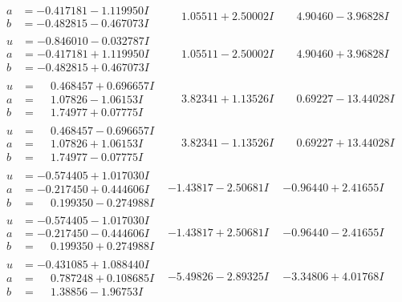 \documentclass[1p]{elsarticle_modified}
\theoremstyle{definition}
\begin{document}
$$\begin{array}{c|c|c}
\begin{aligned}
a &= -0.417181 - 1.119950 I \\
b &= -0.482815 - 0.467073 I\end{aligned}
 & \phantom{-}1.05511 + 2.50002 I & \phantom{-}4.90460 - 3.96828 I \\ \hline\begin{aligned}
u &= -0.846010 - 0.032787 I \\
a &= -0.417181 + 1.119950 I \\
b &= -0.482815 + 0.467073 I\end{aligned}
 & \phantom{-}1.05511 - 2.50002 I & \phantom{-}4.90460 + 3.96828 I \\ \hline\begin{aligned}
u &= \phantom{-}0.468457 + 0.696657 I \\
a &= \phantom{-}1.07826 - 1.06153 I \\
b &= \phantom{-}1.74977 + 0.07775 I\end{aligned}
 & \phantom{-}3.82341 + 1.13526 I & \phantom{-}0.69227 - 13.44028 I \\ \hline\begin{aligned}
u &= \phantom{-}0.468457 - 0.696657 I \\
a &= \phantom{-}1.07826 + 1.06153 I \\
b &= \phantom{-}1.74977 - 0.07775 I\end{aligned}
 & \phantom{-}3.82341 - 1.13526 I & \phantom{-}0.69227 + 13.44028 I \\ \hline\begin{aligned}
u &= -0.574405 + 1.017030 I \\
a &= -0.217450 + 0.444606 I \\
b &= \phantom{-}0.199350 - 0.274988 I\end{aligned}
 & -1.43817 - 2.50681 I & -0.96440 + 2.41655 I \\ \hline\begin{aligned}
u &= -0.574405 - 1.017030 I \\
a &= -0.217450 - 0.444606 I \\
b &= \phantom{-}0.199350 + 0.274988 I\end{aligned}
 & -1.43817 + 2.50681 I & -0.96440 - 2.41655 I \\ \hline\begin{aligned}
u &= -0.431085 + 1.088440 I \\
a &= \phantom{-}0.787248 + 0.108685 I \\
b &= \phantom{-}1.38856 - 1.96753 I\end{aligned}
 & -5.49826 - 2.89325 I & -3.34806 + 4.01768 I \\ \hline\begin{aligned}

\end{aligned}
\end{array}$$
\end{document}
